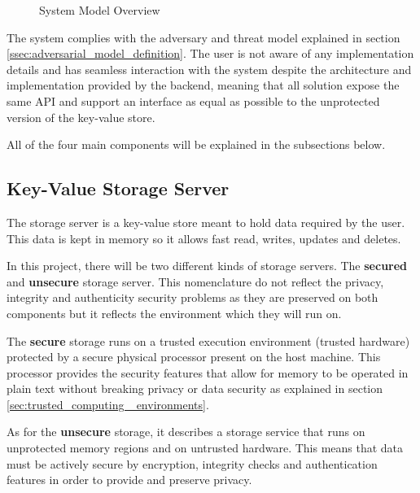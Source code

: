 
\begin{figure}[htbp]
  \caption{System Model Overview}
  \label{fig:system_model_overview}
\end{figure}

The system complies with the adversary and threat model explained in section \ref{ssec:adversarial_model_definition}. The user is not aware of any implementation details and has seamless interaction with the system despite the architecture and implementation provided by the backend, meaning that all solution expose the same \gls{API} and support an interface as equal as possible to the unprotected version of the key-value store. 

All of the four main components will be explained in the subsections below.

\subsection{Key-Value Storage Server}
\label{ssec:key-value_storage_server}

The storage server is a key-value store meant to hold data required by the user. This data is kept in memory so it allows fast read, writes, updates and deletes.

In this project, there will be two different kinds of storage servers. The \textbf{secured} and \textbf{unsecure} storage server. This nomenclature do not reflect the privacy, integrity and authenticity security problems as they are preserved on both components but it reflects the environment which they will run on.

The \textbf{secure} storage runs on a trusted execution environment (trusted hardware) protected by a secure physical processor present on the host machine. This processor provides the security features that allow for memory to be operated in plain text without breaking privacy or data security as explained in section \ref{sec:trusted_computing _environments}.

As for the \textbf{unsecure} storage, it describes a storage service that runs on unprotected memory regions and on untrusted hardware. This means that data must be actively secure by encryption, integrity checks and authentication features in order to provide and preserve privacy.


